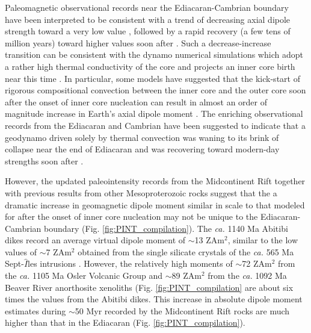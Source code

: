 \documentclass[9pt,twocolumn,twoside,lineno]{pnas-new}
\begin{document}
Paleomagnetic observational records near the Ediacaran-Cambrian boundary have been interpreted to be consistent with a trend of decreasing axial dipole strength toward a very low value \cite{Lloyd2021a, Bono2019a}, followed by a rapid recovery (a few tens of million years) toward higher values soon after \cite{Thallner2021a}. Such a decrease-increase transition can be consistent with the dynamo numerical simulations which adopt a rather high thermal conductivity of the core and projects an inner core birth near this time \cite{Gomi2013a, Davies2015a, Labrosse2015a, Ohta2016a}. In particular, some models have suggested that the kick-start of rigorous compositional convection between the inner core and the outer core soon after the onset of inner core nucleation can result in almost an order of magnitude increase in Earth's axial dipole moment \cite[e.g.]{Davies2021a}. The enriching observational records from the Ediacaran and Cambrian have been suggested to indicate that a geodynamo driven solely by thermal convection was waning to its brink of collapse near the end of Ediacaran \cite{Bono2019a, Thallner2021b} and was recovering toward modern-day strengths soon after \cite{Thallner2021a}.

However, the updated paleointensity records from the Midcontinent Rift together with previous results from other Mesoproterozoic rocks suggest that the a dramatic increase in geomagnetic dipole moment similar in scale to that modeled for after the onset of inner core nucleation may not be unique to the Ediacaran-Cambrian boundary (Fig. \ref{fig:PINT_compilation}). The \textit{ca.} 1140 Ma Abitibi dikes \cite{Macouin2003a} record an average virtual dipole moment of $\sim$13 ZAm$^2$, similar to the low values of $\sim$7 ZAm$^2$ obtained from the single silicate crystals of the \textit{ca.} 565 Ma Sept-$\hat{I}$les intrusions \cite{Bono2019a}. However, the relatively high moments of $\sim$72 ZAm$^2$ from the \textit{ca.} 1105 Ma Osler Volcanic Group \cite{Sprain2018a} and $\sim$89 ZAm$^2$ from the \textit{ca.} 1092 Ma Beaver River anorthosite xenoliths (Fig. \ref{fig:PINT_compilation} are about six times the values from the Abitibi dikes. This increase in absolute dipole moment estimates during $\sim$50 Myr recorded by the Midcontinent Rift rocks are much higher than that in the Ediacaran (Fig. \ref{fig:PINT_compilation}). 
\end{document}
